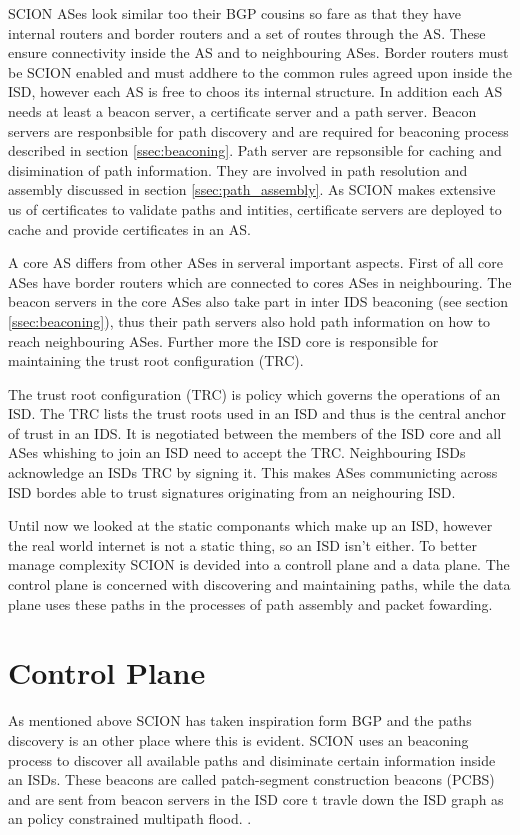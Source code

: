 \documentclass[../eva1_scion.tex]{subfiles}
\begin{document}
    SCION ASes look similar too their BGP cousins so fare as that they have internal routers and border routers and a set of routes through the AS. These ensure connectivity inside the AS and to neighbouring ASes. Border routers must be SCION enabled and must addhere to the common rules agreed upon inside the ISD, however each AS is free to choos its internal structure. In addition each AS needs at least a beacon server, a certificate server and a path server. Beacon servers are responbsible for path discovery and are required for beaconing process described in section \ref{ssec:beaconing}. Path server are repsonsible for caching and disimination of path information. They are involved in path resolution and assembly discussed in section \ref{ssec:path_assembly}. As SCION makes extensive us of certificates to validate paths and intities, certificate servers are deployed to cache and provide certificates in an AS.
    
    A core AS differs from other ASes in serveral important aspects. First of all core ASes have border routers which are connected to cores ASes in neighbouring. The beacon servers in the core ASes also take part in inter IDS beaconing (see section \ref{ssec:beaconing}), thus their path servers also hold path information on how to reach neighbouring ASes. Further more the ISD core is responsible for maintaining the trust root configuration (TRC).

    The trust root configuration (TRC) is policy which governs the operations of an ISD. The TRC lists the trust roots used in an ISD and thus is the central anchor of trust in an IDS. It is negotiated between the members of the ISD core and all ASes whishing to join  an ISD need to accept the TRC. Neighbouring ISDs acknowledge an ISDs TRC by signing it. This makes ASes communicting across ISD bordes able to trust signatures originating from an neighouring ISD. 

    Until now we looked at the static componants which make up an ISD, however the real world internet is not a static thing, so an ISD isn't either. To better manage complexity SCION is devided into a controll plane and a data plane. The control plane is concerned with discovering and maintaining paths, while the data plane uses these paths in the processes of path assembly and packet fowarding.

    \section{Control Plane}
    As mentioned above SCION has taken inspiration form BGP and the paths discovery is an other place where this is evident. SCION uses an beaconing process to discover all available paths and disiminate certain information inside an ISDs.  These beacons are called patch-segment construction beacons (PCBS) and are  sent from beacon servers in the ISD core t travle down the ISD graph as an policy constrained multipath flood. \cite{scion_2011}.
\end{document}
